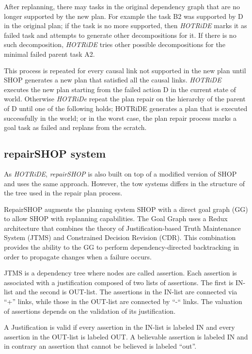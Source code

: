After replanning, there may tasks in the original dependency graph that are no longer supported by the new plan. For example the task B2 was supported by D in the original plan; if the task is no more supported, then \textit{HOTRiDE} marks it as failed task and attempts to generate other decompositions for it. If there is no such decomposition, \textit{HOTRiDE} tries other possible decompositions for the minimal failed parent task A2.

This process is repeated for every causal link not supported in the new plan until SHOP generates a new plan that satisfied all the causal links. \textit{HOTRiDE} executes the new plan starting from the failed action D in the current state of world.  Otherwise \textit{HOTRiDe} repeat the plan repair on the hierarchy of the parent of D until one of the following holds; HOTRiDE generates a plan that is executed successfully in the world; or in the worst case, the plan repair process marks a goal task as failed and replans from the scratch. 

\subsection{repairSHOP system}

As \textit{HOTRiDE}, \textit{repairSHOP} is also built on top of a modified version of SHOP  \cite{warfield2007adaptation} and uses the same approach. However, the tow systems differs in the structure of the tree used in the repair plan process. 


RepairSHOP augments the planning system SHOP with a direct goal graph (GG) to allow SHOP with replanning capabilities.  The Goal Graph uses a Redux architecture that combines the theory of Justification-based Truth Maintenance System (JTMS) and Constrained Decision Revision (CDR). This combination provides the ability to the GG to perform dependency-directed backtracking in order to propagate changes when a failure occurs.  


JTMS is a dependency tree where nodes are called assertion. Each assertion is associated with a justification  composed of two lists of assertions. The first is IN-list and the second is OUT-list. The assertions in the IN-list are connected via “+” links, while those in the OUT-list are connected by “-“ links. The valuation of assertions depends on the validation of its justification. 

A Justification is valid if every assertion in the IN-list is labeled IN and every assertion in the OUT-list is labeled OUT. A believable assertion is labeled IN and in contrary an assertion that cannot be believed is labeled “out”. 



